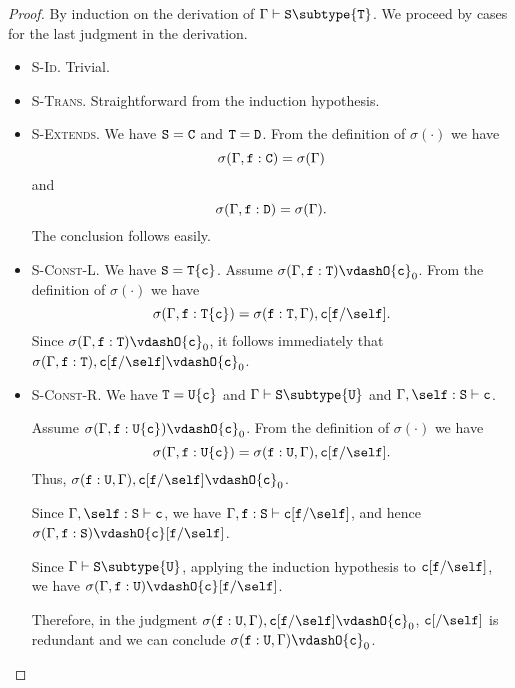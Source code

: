 \begin{proof}
By induction on the derivation of 
     $\Gamma \vdash {\tt S} \subtype {\tt T}$.
We proceed by cases for the last judgment in the derivation.
\begin{itemize}
\item \textsc{S-Id}.
Trivial.
\item \textsc{S-Trans}.
Straightforward from the induction hypothesis.
\item \textsc{S-Extends}.
We have
${\tt S} = {\tt C}$ and ${\tt T} = {\tt D}$.
From the definition of $\sigma(\cdot)$ we have
    $$\sigma(\Gamma,{\tt f}: {\tt C}) = \sigma(\Gamma)$$
    and
    $$\sigma(\Gamma,{\tt f}: {\tt D}) = \sigma(\Gamma).$$
The conclusion follows easily.

\item \textsc{S-Const-L}.
We have
${\tt S} = {\tt T\{c\}}$.
Assume
$\sigma(\Gamma,{\tt f}: {\tt T}) \vdashO {\tt c}_0$.
From the definition of $\sigma(\cdot)$ we have
    $$\sigma(\Gamma,{\tt f}: {\tt T\{c\}}) = 
      \sigma({\tt f}: {\tt T}, \Gamma), {\tt c}[{\tt f}/\self].$$
Since
$\sigma(\Gamma,{\tt f}: {\tt T}) \vdashO {\tt c}_0$, it follows immediately that
$\sigma(\Gamma,{\tt f}: {\tt T}), {\tt c}[{\tt f}/\self] \vdashO {\tt c}_0$.

\item \textsc{S-Const-R}.
We have
${\tt T} = {\tt U\{c\}}$ and $\Gamma \vdash {\tt S} \subtype {\tt U}$
and $\Gamma, \self: {\tt S} \vdash {\tt c}$.

Assume
$\sigma(\Gamma,{\tt f}: {\tt U\{c\}}) \vdashO {\tt c}_0$.
From the definition of $\sigma(\cdot)$ we have
    $$\sigma(\Gamma,{\tt f}: {\tt U\{c\}}) = 
      \sigma({\tt f}: {\tt U}, \Gamma), {\tt c}[{\tt f}/\self].$$
Thus,
    $\sigma({\tt f}: {\tt U}, \Gamma), {\tt c}[{\tt f}/\self] \vdashO {\tt c}_0$.

Since
$\Gamma, \self: {\tt S} \vdash {\tt c}$,
we have
$\Gamma, {\tt f}: {\tt S} \vdash {\tt c}[{\tt f}/\self]$,
and hence
$\sigma(\Gamma, {\tt f}: {\tt S}) \vdashO {\tt c}[{\tt f}/\self]$.

Since 
$\Gamma \vdash {\tt S} \subtype {\tt U}$,
applying the induction hypothesis to ${\tt c}[{\tt f}/\self]$, we have
$\sigma(\Gamma, {\tt f}: {\tt U}) \vdashO {\tt c}[{\tt f}/\self]$.

Therefore, in the judgment
$\sigma({\tt f}: {\tt U}, \Gamma), {\tt c}[{\tt f}/\self] \vdashO {\tt c}_0$,
${\tt c}[{\tt }/\self]$ is redundant and we can conclude
    $\sigma({\tt f}: {\tt U}, \Gamma) \vdashO {\tt c}_0$.


\end{itemize}
\end{proof}
